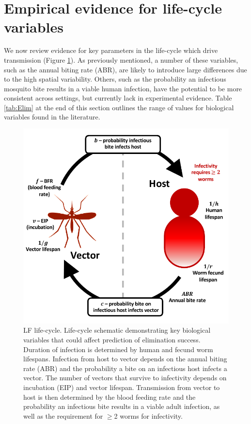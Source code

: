\section[Life-cycle variables]{Empirical evidence for life-cycle variables}

We now review evidence for key parameters in the life-cycle which drive transmission (Figure \ref{fig:Elim_3}). As previously mentioned, a number of these variables, such as the annual biting rate (ABR), are likely to introduce large differences due to the high spatial variability. Others, such as the probability an infectious mosquito bite results in a viable human infection, have the potential to be more consistent across settings, but currently lack in experimental evidence. Table \ref{tab:Elim} at the end of this section outlines the range of values for biological variables found in the literature. 

\begin{figure}
    \centering
    \includegraphics{Project/Figures/LFElimination/Figure3.pdf}
    \caption{LF life-cycle. Life-cycle schematic demonstrating key biological variables that could affect prediction of elimination success. Duration of infection is determined by human and fecund worm lifespans. Infection from host to vector depends on the annual biting rate (ABR) and the probability a bite on an infectious host infects a vector. The number of vectors that survive to infectivity depends on incubation (EIP) and vector lifespan. Transmission from vector to host is then determined by the blood feeding rate and the probability an infectious bite results in a viable adult infection, as well as the requirement for $\geq$2 worms for infectivity.}
    \label{fig:Elim_3}
\end{figure}

